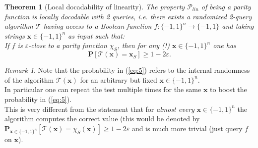 \documentclass[a4paper]{article}
\newcommand{\prob}{\mathbf{P}}
\newcommand{\eps}{\varepsilon}
\newcommand{\boldx}{\boldsymbol{x}}
\theoremstyle{plain}
\newtheorem{theorem}{Theorem}
\theoremstyle{definition}
\theoremstyle{remark}
\newtheorem*{remark*}{Remark}
\begin{document}
\begin{theorem}[Local docadability of linearity] \label{thm:3}
  The property \(\mathcal{P}_{lin}\) of being a parity function is
  \emph{locally docodable} with 2 queries, i.e. there exists a
  randomized 2-query algorithm \(\mathcal{T}\) having access to a
  Boolean function \(f:\{-1,1\}^n \rightarrow \{-1,1\}\) and taking
  strings \(\boldx \in \{-1,1\}^n\) as input such that: \\
  If \(f\) is \(\eps\)-close to a  parity function \(\chi_S\), then
  for any (!) \(\boldx \in \{-1,1\}^n\) one has    
  \begin{equation}
    \label{eq:5}
    \prob\left[\mathcal{T}(\boldx) = \boldx_S\right] \geq 1 - 2\eps. 
  \end{equation}
\end{theorem}

\begin{remark*}
Note that the probability in (\ref{eq:5}) refers to the internal
randomness of the algorithm \(\mathcal{T}(\boldx)\) for an arbitrary but
fixed \(\boldx \in \{-1,1\}^n\).\\
In particular one can repeat the test multiple times for the same
\(\boldx\) to boost the probability in (\ref{eq:5}). \\ 
This is very different from the statement that for \emph{almost
  every} \(\boldx \in \{-1,1\}^n\) the algorithm computes the correct
value (this would be denoted by  \(\prob_{\boldx \in
  \{-1,1\}^n}[\mathcal{T}(\boldx) = \chi_S(\boldx)] \geq 1 -2\eps \)
and is much more trivial (just query \(f\) on \(\boldx\)).\\
\end{remark*}
\end{document}
